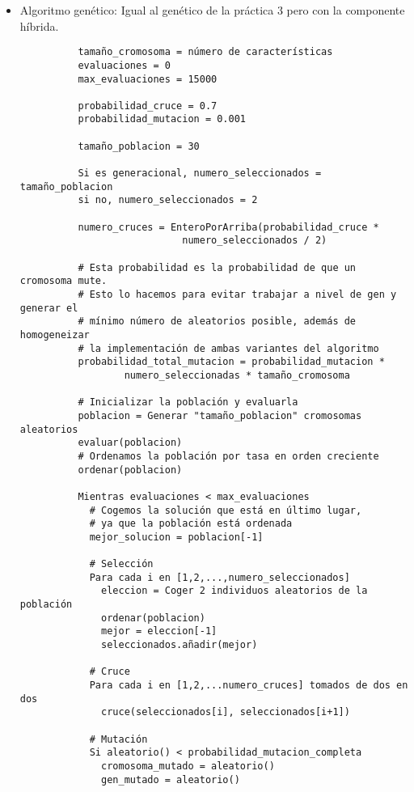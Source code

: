 \documentclass[a4paper, 11pt]{article}
\begin{document}
    \begin{itemize}
      \item Algoritmo genético: Igual al genético de la práctica 3 pero con
      la componente híbrida.
        \begin{verbatim}
          tamaño_cromosoma = número de características
          evaluaciones = 0
          max_evaluaciones = 15000

          probabilidad_cruce = 0.7
          probabilidad_mutacion = 0.001

          tamaño_poblacion = 30

          Si es generacional, numero_seleccionados = tamaño_poblacion
          si no, numero_seleccionados = 2

          numero_cruces = EnteroPorArriba(probabilidad_cruce *
                            numero_seleccionados / 2)

          # Esta probabilidad es la probabilidad de que un cromosoma mute.
          # Esto lo hacemos para evitar trabajar a nivel de gen y generar el
          # mínimo número de aleatorios posible, además de homogeneizar
          # la implementación de ambas variantes del algoritmo
          probabilidad_total_mutacion = probabilidad_mutacion *
                  numero_seleccionadas * tamaño_cromosoma

          # Inicializar la población y evaluarla
          poblacion = Generar "tamaño_poblacion" cromosomas aleatorios
          evaluar(poblacion)
          # Ordenamos la población por tasa en orden creciente
          ordenar(poblacion)

          Mientras evaluaciones < max_evaluaciones
            # Cogemos la solución que está en último lugar,
            # ya que la población está ordenada
            mejor_solucion = poblacion[-1]

            # Selección
            Para cada i en [1,2,...,numero_seleccionados]
              eleccion = Coger 2 individuos aleatorios de la población
              ordenar(poblacion)
              mejor = eleccion[-1]
              seleccionados.añadir(mejor)

            # Cruce
            Para cada i en [1,2,...numero_cruces] tomados de dos en dos
              cruce(seleccionados[i], seleccionados[i+1])

            # Mutación
            Si aleatorio() < probabilidad_mutacion_completa
              cromosoma_mutado = aleatorio()
              gen_mutado = aleatorio()


\end{verbatim}
\end{itemize}
\end{document}
